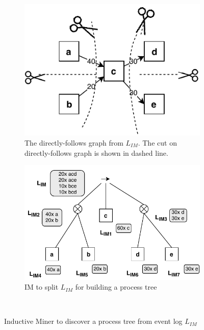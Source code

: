\begin{figure}[!h]
	\centering
	\begin{subfigure}[b]{0.4\textwidth}
		\centering
		\includegraphics[width=\linewidth]{figures/preliminary/IM-demo-directly-follows.pdf}
		\caption{The directly-follows graph from $L_{IM}$. \small{The cut on directly-follows graph is shown in dashed line.}}
		\label{fig:IM-dfg}
	\end{subfigure}%
	\quad
	\begin{subfigure}[b]{0.55\textwidth}
		\centering
		\includegraphics[width=\linewidth]{figures/preliminary/IM-demo-split-procedure.pdf}
		\caption{IM to split $L_{IM}$ for building a process tree}
		\label{fig:IM-split}
	\end{subfigure}%
	\\ %
	\caption{Inductive Miner to discover a process tree from event log $L_{IM}$}
	\label{fig:IM-demo}
\end{figure}

